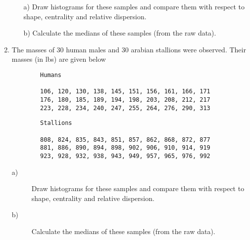 \documentclass[]{report}
\begin{document}
\begin{enumerate}
\begin{itemize}
	\item[a)] Draw histograms for these samples and compare them with respect to shape, centrality and relative dispersion. 
	\item[b)] Calculate the medians of these samples (from the raw data).
\end{itemize}




\item 
The masses of 30 human males and 30 arabian stallions were observed. Their masses (in lbs) are given below
{
	\large
	\begin{framed}
		\begin{verbatim}
		Humans
		
		106, 120, 130, 138, 145, 151, 156, 161, 166, 171
		176, 180, 185, 189, 194, 198, 203, 208, 212, 217
		223, 228, 234, 240, 247, 255, 264, 276, 290, 313
		\end{verbatim}
	\end{framed}

	\large
	\begin{framed}
		\begin{verbatim}
		Stallions
		
		808, 824, 835, 843, 851, 857, 862, 868, 872, 877
		881, 886, 890, 894, 898, 902, 906, 910, 914, 919
		923, 928, 932, 938, 943, 949, 957, 965, 976, 992
		\end{verbatim}
	\end{framed}
}
\begin{description}
	\item[a)]	Draw histograms for these samples and compare them with respect to shape, centrality and relative dispersion. 
	\item[b)]	Calculate the medians of these samples (from the raw data).
	
\end{description}
	

\end{enumerate}
\end{document}
